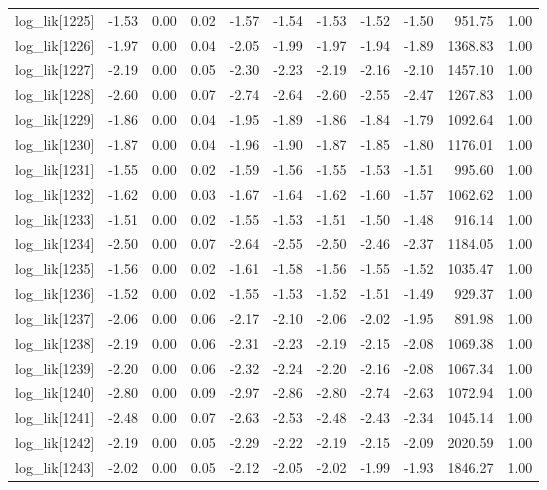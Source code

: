 \begin{table}[ht]
\begin{tabular}{rrrrrrrrrrr}
  log\_lik[1225] & -1.53 & 0.00 & 0.02 & -1.57 & -1.54 & -1.53 & -1.52 & -1.50 & 951.75 & 1.00 \\ 
  log\_lik[1226] & -1.97 & 0.00 & 0.04 & -2.05 & -1.99 & -1.97 & -1.94 & -1.89 & 1368.83 & 1.00 \\ 
  log\_lik[1227] & -2.19 & 0.00 & 0.05 & -2.30 & -2.23 & -2.19 & -2.16 & -2.10 & 1457.10 & 1.00 \\ 
  log\_lik[1228] & -2.60 & 0.00 & 0.07 & -2.74 & -2.64 & -2.60 & -2.55 & -2.47 & 1267.83 & 1.00 \\ 
  log\_lik[1229] & -1.86 & 0.00 & 0.04 & -1.95 & -1.89 & -1.86 & -1.84 & -1.79 & 1092.64 & 1.00 \\ 
  log\_lik[1230] & -1.87 & 0.00 & 0.04 & -1.96 & -1.90 & -1.87 & -1.85 & -1.80 & 1176.01 & 1.00 \\ 
  log\_lik[1231] & -1.55 & 0.00 & 0.02 & -1.59 & -1.56 & -1.55 & -1.53 & -1.51 & 995.60 & 1.00 \\ 
  log\_lik[1232] & -1.62 & 0.00 & 0.03 & -1.67 & -1.64 & -1.62 & -1.60 & -1.57 & 1062.62 & 1.00 \\ 
  log\_lik[1233] & -1.51 & 0.00 & 0.02 & -1.55 & -1.53 & -1.51 & -1.50 & -1.48 & 916.14 & 1.00 \\ 
  log\_lik[1234] & -2.50 & 0.00 & 0.07 & -2.64 & -2.55 & -2.50 & -2.46 & -2.37 & 1184.05 & 1.00 \\ 
  log\_lik[1235] & -1.56 & 0.00 & 0.02 & -1.61 & -1.58 & -1.56 & -1.55 & -1.52 & 1035.47 & 1.00 \\ 
  log\_lik[1236] & -1.52 & 0.00 & 0.02 & -1.55 & -1.53 & -1.52 & -1.51 & -1.49 & 929.37 & 1.00 \\ 
  log\_lik[1237] & -2.06 & 0.00 & 0.06 & -2.17 & -2.10 & -2.06 & -2.02 & -1.95 & 891.98 & 1.00 \\ 
  log\_lik[1238] & -2.19 & 0.00 & 0.06 & -2.31 & -2.23 & -2.19 & -2.15 & -2.08 & 1069.38 & 1.00 \\ 
  log\_lik[1239] & -2.20 & 0.00 & 0.06 & -2.32 & -2.24 & -2.20 & -2.16 & -2.08 & 1067.34 & 1.00 \\ 
  log\_lik[1240] & -2.80 & 0.00 & 0.09 & -2.97 & -2.86 & -2.80 & -2.74 & -2.63 & 1072.94 & 1.00 \\ 
  log\_lik[1241] & -2.48 & 0.00 & 0.07 & -2.63 & -2.53 & -2.48 & -2.43 & -2.34 & 1045.14 & 1.00 \\ 
  log\_lik[1242] & -2.19 & 0.00 & 0.05 & -2.29 & -2.22 & -2.19 & -2.15 & -2.09 & 2020.59 & 1.00 \\ 
  log\_lik[1243] & -2.02 & 0.00 & 0.05 & -2.12 & -2.05 & -2.02 & -1.99 & -1.93 & 1846.27 & 1.00 \\ 

\end{tabular}
\end{table}
